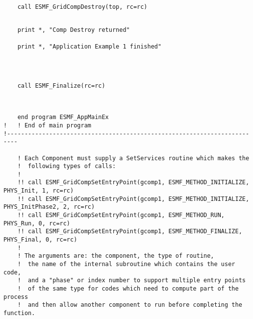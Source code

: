 
 \begin{verbatim}
    call ESMF_GridCompDestroy(top, rc=rc)
 
\end{verbatim}
 

 \begin{verbatim}
    print *, "Comp Destroy returned"

    print *, "Application Example 1 finished"

 
\end{verbatim}
 

 \begin{verbatim}

    call ESMF_Finalize(rc=rc)
 
\end{verbatim}
 

 \begin{verbatim}

    end program ESMF_AppMainEx
!   ! End of main program
!-------------------------------------------------------------------------

    ! Each Component must supply a SetServices routine which makes the
    !  following types of calls:
    !
    !! call ESMF_GridCompSetEntryPoint(gcomp1, ESMF_METHOD_INITIALIZE, PHYS_Init, 1, rc=rc)
    !! call ESMF_GridCompSetEntryPoint(gcomp1, ESMF_METHOD_INITIALIZE, PHYS_InitPhase2, 2, rc=rc)
    !! call ESMF_GridCompSetEntryPoint(gcomp1, ESMF_METHOD_RUN, PHYS_Run, 0, rc=rc)
    !! call ESMF_GridCompSetEntryPoint(gcomp1, ESMF_METHOD_FINALIZE, PHYS_Final, 0, rc=rc)
    !
    ! The arguments are: the component, the type of routine, 
    !  the name of the internal subroutine which contains the user code, 
    !  and a "phase" or index number to support multiple entry points 
    !  of the same type for codes which need to compute part of the process
    !  and then allow another component to run before completing the function.

 
\end{verbatim}

\setlength{\parskip}{\oldparskip}
\setlength{\parindent}{\oldparindent}
\setlength{\baselineskip}{\oldbaselineskip}
